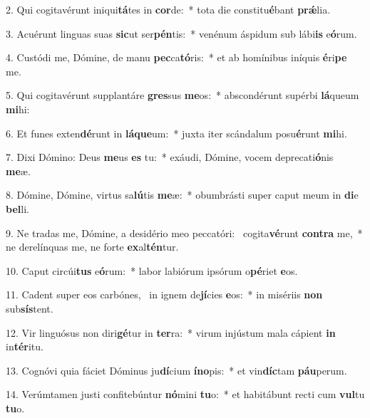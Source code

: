 2. Qui cogitavérunt iniqui\textbf{tá}tes in \textbf{cor}de:~*  tota die constitu\textbf{é}bant \textbf{prǽ}lia.\

3. Acuérunt linguas suas \textbf{sic}ut ser\textbf{pén}tis:~*  venénum áspidum sub lábi\textbf{is} e\textbf{ó}rum.\

4. Custódi me, Dómine, de manu \textbf{pec}ca\textbf{tó}ris:~*  et ab homínibus iníquis \textbf{é}ri\textbf{pe} me.\

5. Qui cogitavérunt supplantáre \textbf{gres}sus \textbf{me}os:~*  abscondérunt supérbi \textbf{lá}queum \textbf{mi}hi:\

6. Et funes exten\textbf{dé}runt in \textbf{lá}\textbf{que}um:~*  juxta iter scándalum posu\textbf{é}runt \textbf{mi}hi.\

7. Dixi Dómino: Deus \textbf{me}us \textbf{es} tu:~*  exáudi, Dómine, vocem deprecati\textbf{ó}nis \textbf{me}æ.\

8. Dómine, Dómine, virtus sa\textbf{lú}tis \textbf{me}æ:~*  obumbrásti super caput meum in \textbf{di}e \textbf{bel}li.\

9. Ne tradas me, Dómine, a desidério meo peccatóri: \dag\  cogita\textbf{vé}runt \textbf{con}\textbf{tra} me,~*  ne derelínquas me, ne forte \textbf{ex}al\textbf{tén}tur.\

10. Caput circúi\textbf{tus} e\textbf{ó}rum:~*  labor labiórum ipsórum o\textbf{pé}riet \textbf{e}os.\

11. Cadent super eos carbónes, \dag\  in ignem de\textbf{jí}cies \textbf{e}os:~*  in misériis \textbf{non} sub\textbf{sís}tent.\

12. Vir linguósus non diri\textbf{gé}tur in \textbf{ter}ra:~*  virum injústum mala cápient \textbf{in} in\textbf{tér}itu.\

13. Cognóvi quia fáciet Dóminus ju\textbf{dí}cium \textbf{ín}\textbf{o}pis:~*  et vin\textbf{díc}tam \textbf{páu}perum.\

14. Verúmtamen justi confitebúntur \textbf{nó}mini \textbf{tu}o:~*  et habitábunt recti cum \textbf{vul}tu \textbf{tu}o.\

